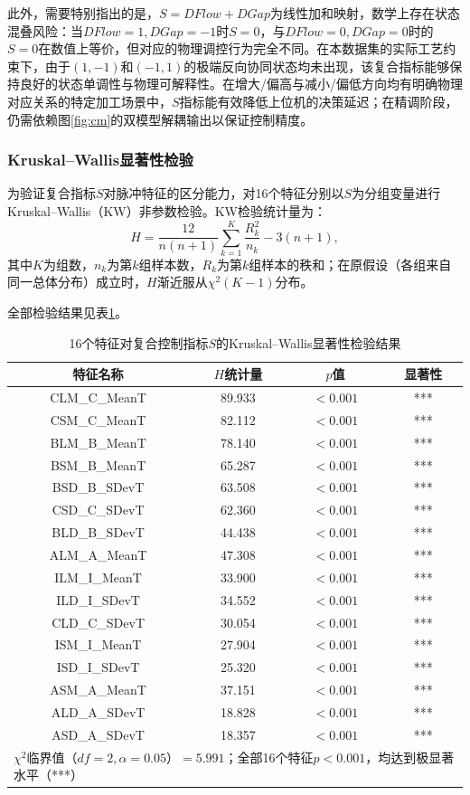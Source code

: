\documentclass[UTF8,a4paper,12pt]{ctexart}
\begin{document}
此外，需要特别指出的是，$S=DFlow+DGap$为线性加和映射，数学上存在状态混叠风险：当$DFlow=1,DGap=-1$时$S=0$，与$DFlow=0,DGap=0$时的$S=0$在数值上等价，但对应的物理调控行为完全不同。在本数据集的实际工艺约束下，由于$(1,-1)$和$(-1,1)$的极端反向协同状态均未出现，该复合指标能够保持良好的状态单调性与物理可解释性。在增大/偏高与减小/偏低方向均有明确物理对应关系的特定加工场景中，$S$指标能有效降低上位机的决策延迟；在精调阶段，仍需依赖图\ref{fig:cm}的双模型解耦输出以保证控制精度。

\subsubsection{Kruskal--Wallis显著性检验}

为验证复合指标$S$对脉冲特征的区分能力，对16个特征分别以$S$为分组变量进行Kruskal--Wallis（KW）非参数检验。KW检验统计量为：
\begin{equation}
H=\frac{12}{n(n+1)}\sum_{k=1}^{K}\frac{R_k^2}{n_k}-3(n+1),
\end{equation}
其中$K$为组数，$n_k$为第$k$组样本数，$R_k$为第$k$组样本的秩和；在原假设（各组来自同一总体分布）成立时，$H$渐近服从$\chi^2(K-1)$分布。

全部检验结果见表\ref{tab:kw-full}。

\begin{table}[H]
\centering
\caption{16个特征对复合控制指标$S$的Kruskal--Wallis显著性检验结果}
\label{tab:kw-full}
\begin{tabular}{cccc}
\toprule
特征名称 & $H$统计量 & $p$值 & 显著性 \\
\midrule
CLM\_C\_MeanT & 89.933 & $<0.001$ & *** \\
CSM\_C\_MeanT & 82.112 & $<0.001$ & *** \\
BLM\_B\_MeanT & 78.140 & $<0.001$ & *** \\
BSM\_B\_MeanT & 65.287 & $<0.001$ & *** \\
BSD\_B\_SDevT & 63.508 & $<0.001$ & *** \\
CSD\_C\_SDevT & 62.360 & $<0.001$ & *** \\
BLD\_B\_SDevT & 44.438 & $<0.001$ & *** \\
ALM\_A\_MeanT & 47.308 & $<0.001$ & *** \\
ILM\_I\_MeanT & 33.900 & $<0.001$ & *** \\
ILD\_I\_SDevT & 34.552 & $<0.001$ & *** \\
CLD\_C\_SDevT & 30.054 & $<0.001$ & *** \\
ISM\_I\_MeanT & 27.904 & $<0.001$ & *** \\
ISD\_I\_SDevT & 25.320 & $<0.001$ & *** \\
ASM\_A\_MeanT & 37.151 & $<0.001$ & *** \\
ALD\_A\_SDevT & 18.828 & $<0.001$ & *** \\
ASD\_A\_SDevT & 18.357 & $<0.001$ & *** \\
\midrule
\multicolumn{4}{l}{\footnotesize$\chi^2$临界值（$df=2,\alpha=0.05$）$=5.991$；全部16个特征$p<0.001$，均达到极显著水平（***）} \\
\bottomrule
\end{tabular}
\end{table}
\end{document}
